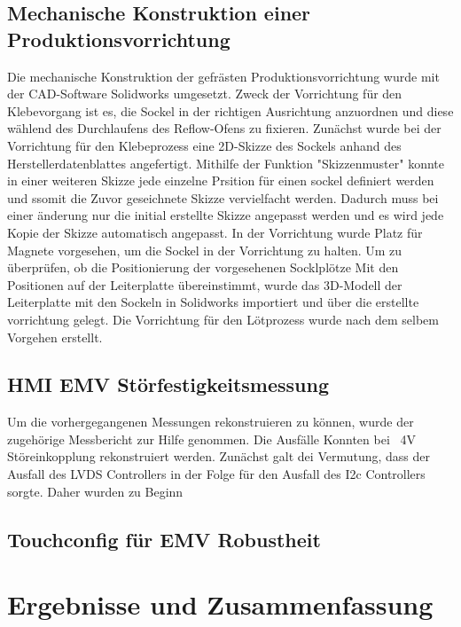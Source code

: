 \documentclass[praktikum,german]{hgbthesis}
\begin{document}
\section{Mechanische Konstruktion einer Produktionsvorrichtung}
Die mechanische Konstruktion der gefrästen Produktionsvorrichtung wurde mit der CAD-Software Solidworks umgesetzt. Zweck der Vorrichtung für den Klebevorgang ist es, die Sockel in der richtigen Ausrichtung anzuordnen und diese wählend des Durchlaufens des Reflow-Ofens zu fixieren. Zunächst wurde bei der Vorrichtung für den Klebeprozess eine 2D-Skizze des Sockels anhand des Herstellerdatenblattes angefertigt. Mithilfe der Funktion "Skizzenmuster" konnte in einer weiteren Skizze jede einzelne Prsition für einen sockel definiert werden und ssomit die Zuvor geseichnete Skizze vervielfacht werden. Dadurch muss bei einer änderung nur die initial erstellte Skizze angepasst werden und es wird jede Kopie der Skizze automatisch angepasst. In der Vorrichtung wurde Platz für Magnete vorgesehen, um die Sockel in der Vorrichtung zu halten. Um zu überprüfen, ob die Positionierung der vorgesehenen Socklplötze Mit den Positionen auf der Leiterplatte übereinstimmt, wurde das 3D-Modell der Leiterplatte mit den Sockeln in Solidworks importiert und über die erstellte vorrichtung gelegt. Die Vorrichtung für den Lötprozess wurde nach dem selbem Vorgehen erstellt.

\section{HMI EMV Störfestigkeitsmessung}
Um die vorhergegangenen Messungen rekonstruieren zu können, wurde der zugehörige Messbericht zur Hilfe genommen. Die Ausfälle Konnten bei ~4V Störeinkopplung rekonstruiert werden. Zunächst galt dei Vermutung, dass der Ausfall des LVDS Controllers in der Folge für den Ausfall des I2c Controllers sorgte. Daher wurden zu Beginn 

\section{Touchconfig für EMV Robustheit}

\chapter{Ergebnisse und Zusammenfassung}
\end{document}
